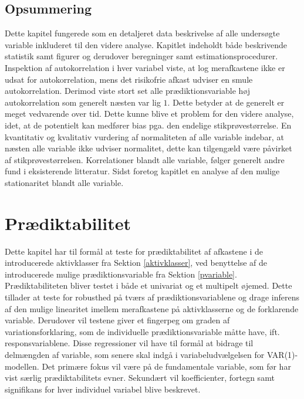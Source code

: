 \documentclass[
  a4paper,
  oneside]{memoir}
\begin{document}
\begin{table}[H]
\begin{threeparttable}
\begin{tablenotes}
\end{tablenotes}
\end{threeparttable}
\end{table}

\hypertarget{ops}{%
\section{Opsummering}\label{ops}}

Dette kapitel fungerede som en detaljeret data beskrivelse af alle undersøgte variable inkluderet til den videre analyse. Kapitlet indeholdt både beskrivende statistik samt figurer og derudover beregninger samt estimationsprocedurer. Inspektion af autokorrelation i hver variabel viste, at log merafkastene ikke er udsat for autokorrelation, mens det risikofrie afkast udviser en smule autokorrelation. Derimod viste stort set alle prædiktionsvariable høj autokorrelation som generelt næsten var lig \(1\). Dette betyder at de generelt er meget vedvarende over tid. Dette kunne blive et problem for den videre analyse, idet, at de potentielt kan medfører bias pga. den endelige stikprøvestørrelse. En kvantitativ og kvalitativ vurdering af normaliteten af alle variable indebar, at næsten alle variable ikke udviser normalitet, dette kan tilgengæld være påvirket af stikprøvestørrelsen. Korrelationer blandt alle variable, følger generelt andre fund i eksisterende litteratur. Sidst foretog kapitlet en analyse af den mulige stationaritet blandt alle variable.

\hypertarget{predikta}{%
\chapter{Prædiktabilitet}\label{predikta}}

Dette kapitel har til formål at teste for prædiktabilitet af afkastene i de introducerede aktivklasser fra Sektion \ref{aktivklasser}, ved benyttelse af de introducerede mulige prædiktionsvariable fra Sektion \ref{pvariable}. Prædiktabiliteten bliver testet i både et univariat og et multipelt øjemed. Dette tillader at teste for robusthed på tværs af prædiktionsvariablene og drage inferens af den mulige linearitet imellem merafkastene på aktivklasserne og de forklarende variable. Derudover vil testene giver et fingerpeg om graden af variationsforklaring, som de individuelle prædiktionsvariable måtte have, ift. responsvariablene. Disse regressioner vil have til formål at bidrage til delmængden af variable, som senere skal indgå i variabeludvælgelsen for VAR(1)-modellen. Det primære fokus vil være på de fundamentale variable, som før har vist særlig prædiktabilitets evner. Sekundært vil koefficienter, fortegn samt signifikans for hver individuel variabel blive beskrevet.
\end{document}
